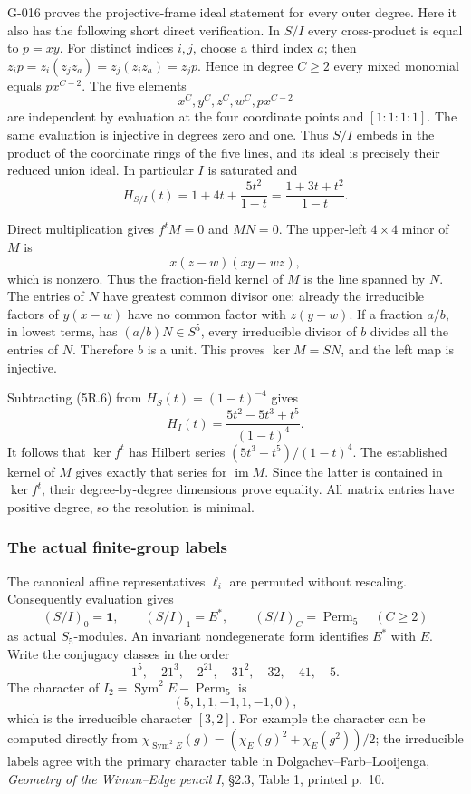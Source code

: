 \documentclass[
  10pt,
]{article}
\begin{document}
G-016 proves the projective-frame ideal statement for every outer
degree. Here it also has the following short direct verification. In
\(S/I\) every cross-product is equal to \(p=xy\). For distinct indices
\(i,j\), choose a third index \(a\); then
\(z_i p=z_i(z_jz_a)=z_j(z_i z_a)=z_jp\). Hence in degree \(C\ge2\) every
mixed monomial equals \(p x^{C-2}\). The five elements \[
x^C,y^C,z^C,w^C,px^{C-2}
\tag{5R.5}
\] are independent by evaluation at the four coordinate points and
\([1:1:1:1]\). The same evaluation is injective in degrees zero and one.
Thus \(S/I\) embeds in the product of the coordinate rings of the five
lines, and its ideal is precisely their reduced union ideal. In
particular \(I\) is saturated and \[
H_{S/I}(t)=1+4t+\frac{5t^2}{1-t}
=\frac{1+3t+t^2}{1-t}.
\tag{5R.6}
\]

Direct multiplication gives \(f^tM=0\) and \(MN=0\). The upper-left
\(4\times4\) minor of \(M\) is \[
x(z-w)(xy-wz),
\tag{5R.7}
\] which is nonzero. Thus the fraction-field kernel of \(M\) is the line
spanned by \(N\). The entries of \(N\) have greatest common divisor one:
already the irreducible factors of \(y(x-w)\) have no common factor with
\(z(y-w)\). If a fraction \(a/b\), in lowest terms, has
\((a/b)N\in S^5\), every irreducible divisor of \(b\) divides all the
entries of \(N\). Therefore \(b\) is a unit. This proves \(\ker M=S N\),
and the left map is injective.

Subtracting (5R.6) from \(H_S(t)=(1-t)^{-4}\) gives \[
H_I(t)=\frac{5t^2-5t^3+t^5}{(1-t)^4}.
\tag{5R.8}
\] It follows that \(\ker f^t\) has Hilbert series
\((5t^3-t^5)/(1-t)^4\). The established kernel of \(M\) gives exactly
that series for \(\operatorname{im}M\). Since the latter is contained in
\(\ker f^t\), their degree-by-degree dimensions prove equality. All
matrix entries have positive degree, so the resolution is minimal.

\subsubsection{The actual finite-group
labels}\label{the-actual-finite-group-labels}

The canonical affine representatives \(\ell_i\) are permuted without
rescaling. Consequently evaluation gives \[
(S/I)_0=\mathbf1,\qquad(S/I)_1=E^*,\qquad
(S/I)_C=\operatorname{Perm}_5\quad(C\ge2)
\tag{5R.9}
\] as actual \(S_5\)-modules. An invariant nondegenerate form identifies
\(E^*\) with \(E\). Write the conjugacy classes in the order \[
1^5,\quad21^3,\quad2^21,\quad31^2,\quad32,\quad41,\quad5.
\tag{5R.10}
\] The character of \(I_2=\operatorname{Sym}^2E-\operatorname{Perm}_5\)
is \[
(5,1,1,-1,1,-1,0),
\tag{5R.11}
\] which is the irreducible character \([3,2]\). For example the
character can be computed directly from
\(\chi_{\operatorname{Sym}^2E}(g)=
(\chi_E(g)^2+\chi_E(g^2))/2\); the irreducible labels agree with the
primary character table in Dolgachev--Farb--Looijenga, \emph{Geometry of
the Wiman--Edge pencil I}, §2.3, Table 1, printed p.~10.
\end{document}
